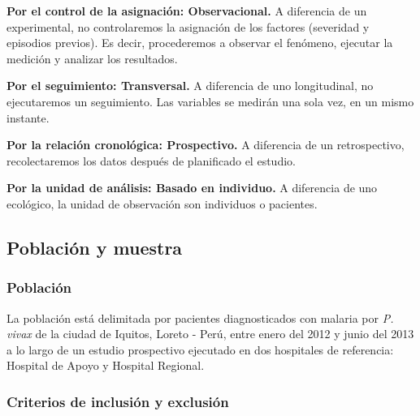 \documentclass[a4paper]{article}
\begin{document}
\textbf{Por el control de la asignación: Observacional.} A diferencia de
un experimental, no controlaremos la asignación de los factores
(severidad y episodios previos). Es decir, procederemos a observar el
fenómeno, ejecutar la medición y analizar los resultados.

\textbf{Por el seguimiento: Transversal.} A diferencia de uno
longitudinal, no ejecutaremos un seguimiento. Las variables se medirán
una sola vez, en un mismo instante.

\textbf{Por la relación cronológica: Prospectivo.} A diferencia de un
retrospectivo, recolectaremos los datos después de planificado el
estudio.

\textbf{Por la unidad de análisis: Basado en individuo.} A diferencia de
uno ecológico, la unidad de observación son individuos o pacientes.

\subsection{Población y muestra}\label{poblacion-y-muestra}

\subsubsection{Población}\label{poblacion}

La población está delimitada por pacientes diagnosticados con malaria
por \emph{P. vivax} de la ciudad de Iquitos, Loreto - Perú, entre enero
del 2012 y junio del 2013 a lo largo de un estudio prospectivo ejecutado
en dos hospitales de referencia: Hospital de Apoyo y Hospital Regional.

\subsubsection{Criterios de inclusión y
exclusión}\label{criterios-de-inclusion-y-exclusion}
\end{document}
